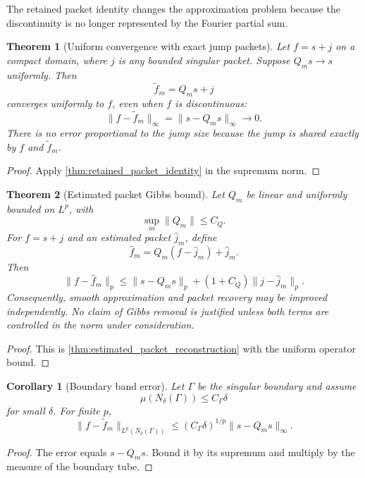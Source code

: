 \documentclass[11pt,letterpaper]{article}
\newtheorem{theorem}{Theorem}[section]
\theoremstyle{plain}
\theoremstyle{plain}
\theoremstyle{plain}
\newtheorem{corollary}[corollary]{Corollary}
\theoremstyle{definition}
\theoremstyle{definition}
\theoremstyle{definition}
\theoremstyle{definition}
\theoremstyle{remark}
\theoremstyle{remark}
\theoremstyle{remark}
\theoremstyle{remark}
\let\KomorebiPrimitiveWidehat\widehat
\renewcommand{\widehat}[1]{\KomorebiPrimitiveWidehat{#1}}
\begin{document}
The retained packet identity changes the approximation problem because the discontinuity is no longer represented by the Fourier partial sum.

\begin{theorem}[Uniform convergence with exact jump packets]\label{thm:uniform_packet_convergence}
Let \(f=s+j\) on a compact domain, where \(j\) is any bounded singular packet. Suppose \(Q_ms\to s\) uniformly. Then
\[
\widetilde f_m=Q_ms+j
\]
converges uniformly to \(f\), even when \(f\) is discontinuous:
\[
\|f-\widetilde f_m\|_\infty
=
\|s-Q_ms\|_\infty
\longrightarrow0.
\]
There is no error proportional to the jump size because the jump is shared exactly by \(f\) and \(\widetilde f_m\).
\end{theorem}

\begin{proof}
Apply \cref{thm:retained_packet_identity} in the supremum norm.
\end{proof}

\begin{theorem}[Estimated packet Gibbs bound]\label{thm:estimated_packet_gibbs}
Let \(Q_m\) be linear and uniformly bounded on \(L^p\), with
\[
\sup_m\|Q_m\|\leq C_Q.
\]
For \(f=s+j\) and an estimated packet \(\widehat j_m\), define
\[
\widehat f_m
=Q_m(f-\widehat j_m)+\widehat j_m.
\]
Then
\[
\|f-\widehat f_m\|_p
\leq
\|s-Q_ms\|_p
+(1+C_Q)\|j-\widehat j_m\|_p.
\]
Consequently, smooth approximation and packet recovery may be improved independently. No claim of Gibbs removal is justified unless both terms are controlled in the norm under consideration.
\end{theorem}

\begin{proof}
This is \cref{thm:estimated_packet_reconstruction} with the uniform operator bound.
\end{proof}

\begin{corollary}[Boundary band error]\label{cor:boundary_band_error}
Let \(\Gamma\) be the singular boundary and assume
\[
\mu(N_\delta(\Gamma))\leq C_\Gamma\delta
\]
for small \(\delta\). For finite \(p\),
\[
\|f-\widetilde f_m\|_{L^p(N_\delta(\Gamma))}
\leq
(C_\Gamma\delta)^{1/p}
\|s-Q_ms\|_\infty.
\]
\end{corollary}

\begin{proof}
The error equals \(s-Q_ms\). Bound it by its supremum and multiply by the measure of the boundary tube.
\end{proof}
\end{document}
